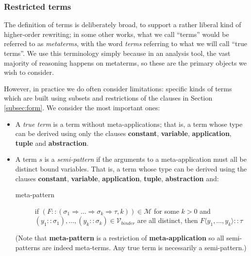 \documentclass{lmcs}
\theoremstyle{theorem}\newtheorem{theorem}{Theorem}
\theoremstyle{theorem}\newtheorem{lemma}[theorem]{Lemma}
\theoremstyle{theorem}\newtheorem{corollary}[theorem]{Corollary}
\theoremstyle{definition}\newtheorem{definition}[theorem]{Definition}
\theoremstyle{definition}\newtheorem{example}[theorem]{Example}
\newcommand{\M}{\mathcal{M}}
\newcommand{\Vbound}{\mathcal{V}_{\mathit{binder}}}
\newcommand{\atype}{\sigma}
\newcommand{\btype}{\tau}
\newcommand{\bvar}{y}
\newcommand{\ameta}{F}
\newcommand{\clause}[1]{\textbf{#1}}
\newcommand{\meta}[2]{#1\langle#2\rangle}
\newcommand{\arrtype}{\Rightarrow}
\newcommand{\mysubsection}[1]{\vspace{-12pt}\subsubsection{#1}}
\begin{document}
\mysubsection{Restricted terms}\label{subsec:termsets}

The definition of terms is deliberately broad, to support a rather liberal kind
of higher-order rewriting; in some other works, what we call ``terms'' would be
referred to as \emph{metaterms}, with the word \emph{terms} referring to what we
will call ``true terms''.  We use this terminology simply because in an analysis
tool, the vast majority of reasoning happens on metaterms, so these are the
primary objects we wish to consider.

However, in practice we do often consider limitations: specific kinds of terms
which are built using subsets and restrictions of the clauses in Section
\ref{subsec:form}.  We consider the most important ones:

\begin{itemize}
\item A \emph{true term} is a term without meta-applications; that is, a term
  whose type can be derived using only the clauses \clause{constant},
  \clause{variable}, \clause{application}, \clause{tuple} and
  \clause{abstraction}.

\item A term $s$ is a \emph{semi-pattern} if the arguments to a meta-application
  must all be distinct bound variables.  That is, a term whose type can be
  derived using the clauses \clause{constant}, \clause{variable},
  \clause{application}, \clause{tuple}, \clause{abstraction} and:
  \begin{description}
  \item[meta-pattern] if $(\ameta :: (\atype_1 \arrtype \dots \arrtype \atype_k
    \arrtype \btype,k)) \in \M$ for some $k > 0$ and $(\bvar_1 :: \atype_1),
    \dots,(\bvar_k :: \atype_k) \in \Vbound$ are all distinct, then
    $\meta{\ameta}{\bvar_1,\dots,\bvar_k} :: \btype$
  \end{description}
  (Note that \clause{meta-pattern} is a restriction of
  \clause{meta-application} so all semi-patterns are indeed meta-terms.  Any
  true term is necessarily a semi-pattern.)


\end{itemize}
\end{document}
